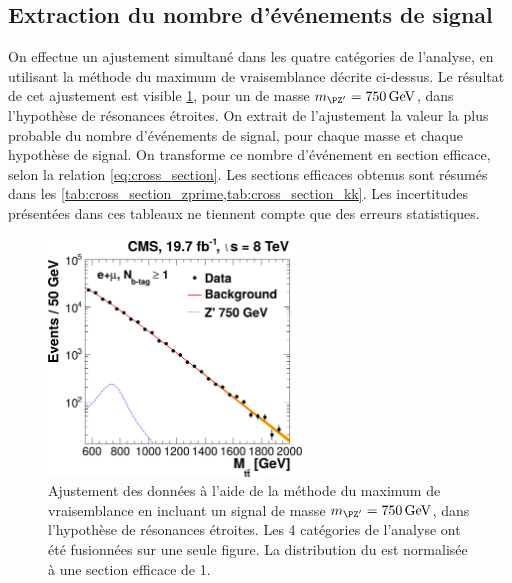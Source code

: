 \subsection{Extraction du nombre d'événements de signal}

On effectue un ajustement simultané dans les quatre catégories de l'analyse, en utilisant la méthode du maximum de vraisemblance décrite ci-dessus. Le résultat de cet ajustement est visible \cref{fig:likelihood_fit}, pour un \zprime de masse $\mzp = \SI{750}{\GeV}$, dans l'hypothèse de résonances étroites. On extrait de l'ajustement la valeur la plus probable du nombre d'événements de signal, pour chaque masse et chaque hypothèse de signal. On transforme ce nombre d'événement en section efficace, selon la relation \ref{eq:cross_section}. Les sections efficaces obtenus sont résumés dans les \cref{tab:cross_section_zprime,tab:cross_section_kk}. Les incertitudes présentées dans ces tableaux ne tiennent compte que des erreurs statistiques.

\begin{figure}[tbp]
  \centering
  \includegraphics[width=0.6\textwidth]{chapitre7/figs/likelihood_fit.pdf}
  \caption{Ajustement des données à l'aide de la méthode du maximum de vraisemblance en incluant un signal de masse $\mzp = \SI{750}{\GeV}$, dans l'hypothèse de résonances étroites. Les 4 catégories de l'analyse ont été fusionnées sur une seule figure. La distribution du \zprime est normalisée à une section efficace de \SI{1}{\pb}.}
  \label{fig:likelihood_fit}
\end{figure}

